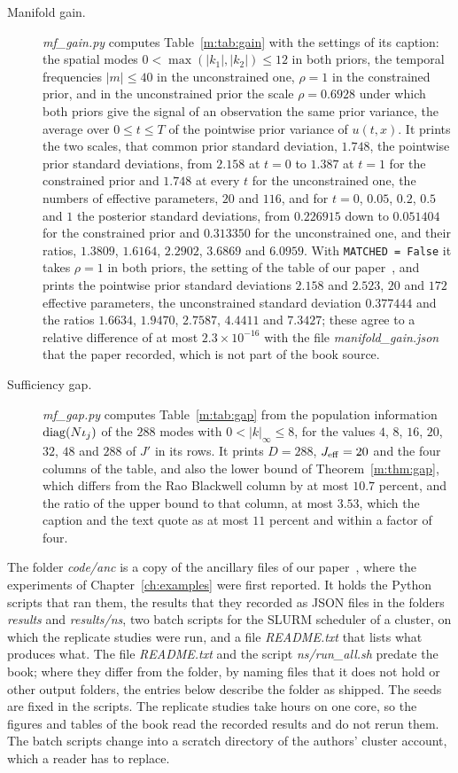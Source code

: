 \begin{description}
\item[Manifold gain.] \textit{mf\_gain.py} computes Table~\ref{m:tab:gain} with the settings of its caption: the spatial modes $0<\max(|k_1|,|k_2|)\le12$ in both priors, the temporal frequencies $|m|\le40$ in the unconstrained one, $\rho=1$ in the constrained prior, and in the unconstrained prior the scale $\rho=0.6928$ under which both priors give the signal of an observation the same prior variance, the average over $0\le t\le T$ of the pointwise prior variance of $u(t,x)$. It prints the two scales, that common prior standard deviation, $1.748$, the pointwise prior standard deviations, from $2.158$ at $t=0$ to $1.387$ at $t=1$ for the constrained prior and $1.748$ at every $t$ for the unconstrained one, the numbers of effective parameters, $20$ and $116$, and for $t=0$, $0.05$, $0.2$, $0.5$ and $1$ the posterior standard deviations, from $0.226915$ down to $0.051404$ for the constrained prior and $0.313350$ for the unconstrained one, and their ratios, $1.3809$, $1.6164$, $2.2902$, $3.6869$ and $6.0959$. With \texttt{MATCHED = False} it takes $\rho=1$ in both priors, the setting of the table of our paper~\cite{polsonsokolov2026manifold}, and prints the pointwise prior standard deviations $2.158$ and $2.523$, $20$ and $172$ effective parameters, the unconstrained standard deviation $0.377444$ and the ratios $1.6634$, $1.9470$, $2.7587$, $4.4411$ and $7.3427$; these agree to a relative difference of at most $2.3\times10^{-16}$ with the file \textit{manifold\_gain.json} that the paper recorded, which is not part of the book source.
\item[Sufficiency gap.] \textit{mf\_gap.py} computes Table~\ref{m:tab:gap} from the population information $\operatorname{diag}(N\iota_j)$ of the $288$ modes with $0<|k|_\infty\le8$, for the values $4$, $8$, $16$, $20$, $32$, $48$ and $288$ of $J'$ in its rows. It prints $D=288$, $J_{\rm eff}=20$ and the four columns of the table, and also the lower bound of Theorem~\ref{m:thm:gap}, which differs from the Rao Blackwell column by at most $10.7$ percent, and the ratio of the upper bound to that column, at most $3.53$, which the caption and the text quote as at most $11$ percent and within a factor of four.
\end{description}

The folder \textit{code/anc} is a copy of the ancillary files of our paper~\cite{polsonsokolov2026manifold}, where the experiments of Chapter~\ref{ch:examples} were first reported. It holds the Python scripts that ran them, the results that they recorded as JSON files in the folders \textit{results} and \textit{results/ns}, two batch scripts for the SLURM scheduler of a cluster, on which the replicate studies were run, and a file \textit{README.txt} that lists what produces what. The file \textit{README.txt} and the script \textit{ns/run\_all.sh} predate the book; where they differ from the folder, by naming files that it does not hold or other output folders, the entries below describe the folder as shipped. The seeds are fixed in the scripts. The replicate studies take hours on one core, so the figures and tables of the book read the recorded results and do not rerun them. The batch scripts change into a scratch directory of the authors' cluster account, which a reader has to replace.


